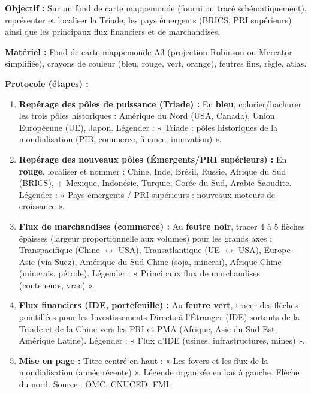\documentclass[11pt]{article}
\begin{document}
\begin{experience}
\textbf{Objectif :} Sur un fond de carte mappemonde (fourni ou tracé schématiquement), représenter et localiser la Triade, les pays émergents (BRICS, PRI supérieurs) ainsi que les principaux flux financiers et de marchandises.

\textbf{Matériel :} Fond de carte mappemonde A3 (projection Robinson ou Mercator simplifiée), crayons de couleur (bleu, rouge, vert, orange), feutres fins, règle, atlas.

\textbf{Protocole (étapes) :}
\begin{enumerate}
\item \textbf{Repérage des pôles de puissance (Triade) :} En \textbf{bleu}, colorier/hachurer les trois pôles historiques : Amérique du Nord (USA, Canada), Union Européenne (UE), Japon. Légender : « Triade : pôles historiques de la mondialisation (PIB, commerce, finance, innovation) ».
\item \textbf{Repérage des nouveaux pôles (Émergents/PRI supérieurs) :} En \textbf{rouge}, localiser et nommer : Chine, Inde, Brésil, Russie, Afrique du Sud (BRICS), + Mexique, Indonésie, Turquie, Corée du Sud, Arabie Saoudite. Légender : « Pays émergents / PRI supérieurs : nouveaux moteurs de croissance ».
\item \textbf{Flux de marchandises (commerce) :} Au \textbf{feutre noir}, tracer 4 à 5 flèches épaisses (largeur proportionnelle aux volumes) pour les grands axes : Transpacifique (Chine $\leftrightarrow$ USA), Transatlantique (UE $\leftrightarrow$ USA), Europe-Asie (via Suez), Amérique du Sud-Chine (soja, minerai), Afrique-Chine (minerais, pétrole). Légender : « Principaux flux de marchandises (conteneurs, vrac) ».
\item \textbf{Flux financiers (IDE, portefeuille) :} Au \textbf{feutre vert}, tracer des flèches pointillées pour les Investissements Directs à l'Étranger (IDE) sortants de la Triade et de la Chine vers les PRI et PMA (Afrique, Asie du Sud-Est, Amérique Latine). Légender : « Flux d'IDE (usines, infrastructures, mines) ».
\item \textbf{Mise en page :} Titre centré en haut : « Les foyers et les flux de la mondialisation (année récente) ». Légende organisée en bas à gauche. Flèche du nord. Source : OMC, CNUCED, FMI.
\end{enumerate}


\end{experience}
\end{document}
